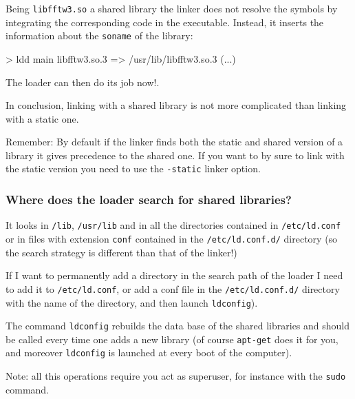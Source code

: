 \documentclass[9pt]{beamer}
\begin{document}
\begin{frame}

  Being \texttt{libfftw3.so} a shared library the linker does not
  resolve the symbols by integrating the corresponding code in the
  executable. Instead, it inserts the information about the
  \texttt{soname} of the library:
\smallskip

\begin{semiverbatim}
> ldd main\newline
libfftw3.so.3 => /usr/lib/libfftw3.so.3 (...)
\end{semiverbatim}
\smallskip
The loader can then do its job now!.
\smallskip

In conclusion, linking with a shared library is not more complicated
than linking with a static one.
\medskip

\alert{Remember:} By default if the linker finds both the static and
shared version of a library it gives precedence to the shared
one. If you want to by sure to link with the static version you need to use 
the \texttt{-static} linker option.
\end{frame}

\begin{frame}
  \frametitle{Where does the loader search for shared libraries?}  

  It looks in \texttt{/lib}, \texttt{/usr/lib} and in all the
  directories contained in \texttt{/etc/ld.conf} or in files with
  extension \texttt{conf} contained in the \texttt{/etc/ld.conf.d/}
  directory (so the search strategy is different than that of the
  linker!)  \smallskip

  If I want to permanently add a directory in the search path of the
  loader I need to add it to \texttt{/etc/ld.conf}, or add a conf file
  in the \texttt{/etc/ld.conf.d/} directory with the name of the
  directory, and then \alert{launch \texttt{ldconfig}}).  \smallskip

  The command \texttt{ldconfig} rebuilds the data base of the shared
  libraries and should be called every time one adds a new library (of
  course \texttt{apt-get} does it for you, and moreover
  \texttt{ldconfig} is launched at every boot of the computer).
  \smallskip

  \alert{Note:} all this operations require you act as superuser, for
  instance with the \texttt{sudo} command.
\end{frame}
\end{document}
